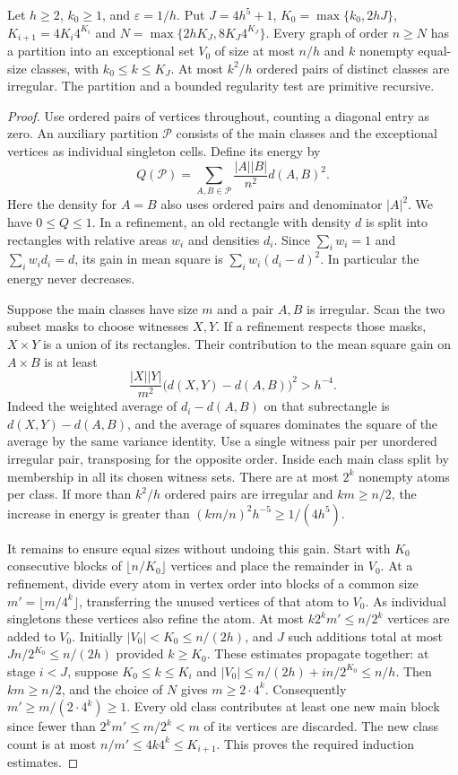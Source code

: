 \begin{theorem}\leavevmode\label{co:regularity}
Let $h\ge2$, $k_0\ge1$, and $\varepsilon=1/h$.
Put $J=4h^5+1$, $K_0=\max\{k_0,2hJ\}$,
$K_{i+1}=4K_i4^{K_i}$ and
$N=\max\{2hK_J,8K_J4^{K_J}\}$.
Every graph of order $n\ge N$ has a partition into an exceptional set
$V_0$ of size at most $n/h$ and $k$ nonempty equal-size classes, with
$k_0\le k\le K_J$. At most $k^2/h$ ordered pairs of distinct classes
are irregular. The partition and a bounded regularity test are
primitive recursive.
\end{theorem}
\begin{proof}
Use ordered pairs of vertices throughout, counting a diagonal entry as
zero. An auxiliary partition $\mathcal P$ consists of the main classes
and the exceptional vertices as individual singleton cells. Define its
energy by
\[
 Q(\mathcal P)=\sum_{A,B\in\mathcal P}\frac{|A||B|}{n^2}
                  d(A,B)^2.
\]
Here the density for $A=B$ also uses ordered pairs and denominator
$|A|^2$. We have $0\le Q\le1$. In a refinement, an old rectangle with
density $d$ is split into rectangles with relative areas $w_i$ and densities
$d_i$. Since $\sum_iw_i=1$ and $\sum_iw_i d_i=d$, its gain in mean
square is $\sum_iw_i(d_i-d)^2$. In particular the energy never decreases.

Suppose the main classes have size $m$ and a pair $A,B$ is irregular.
Scan the two subset masks to choose witnesses $X,Y$. If a refinement
respects those masks, $X\times Y$ is a union of its rectangles. Their
contribution to the mean square gain on $A\times B$ is at least
\[
 \frac{|X||Y|}{m^2}\bigl(d(X,Y)-d(A,B)\bigr)^2> h^{-4}.
\]
Indeed the weighted average of $d_i-d(A,B)$ on that subrectangle is
$d(X,Y)-d(A,B)$, and the average of squares dominates the square
of the average by the same variance identity. Use a single witness
pair per unordered irregular pair, transposing for the opposite order.
Inside each main class split by membership in all its chosen witness sets.
There are at most $2^k$ nonempty atoms per class. If more than $k^2/h$
ordered pairs are irregular and $km\ge n/2$, the increase in energy
is greater than $(km/n)^2 h^{-5}\ge1/(4h^5)$.

It remains to ensure equal sizes without undoing this gain. Start with
$K_0$ consecutive blocks of $\lfloor n/K_0\rfloor$ vertices and place
the remainder in $V_0$. At a refinement, divide every atom in vertex order
into blocks of a common size $m'=\lfloor m/4^k\rfloor$, transferring the
unused vertices of that atom to $V_0$. As individual singletons these
vertices also refine the atom. At most $k2^k m'\le n/2^k$ vertices are
added to $V_0$. Initially $|V_0|<K_0\le n/(2h)$, and $J$ such
additions total at most $Jn/2^{K_0}\le n/(2h)$ provided $k\ge K_0$.
These estimates propagate together: at stage $i<J$, suppose
$K_0\le k\le K_i$ and $|V_0|\le n/(2h)+in/2^{K_0}\le n/h$.
Then $km\ge n/2$, and the choice of $N$ gives $m\ge2\cdot 4^k$.
Consequently $m'\ge m/(2\cdot 4^k)\ge1$. Every old class contributes
at least one new main block since fewer than $2^k m'\le m/2^k<m$
of its vertices are discarded. The new class count is at most
$n/m'\le 4k4^k\le K_{i+1}$. This proves the required induction estimates.


\end{proof}
